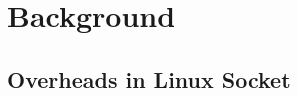 \section{Background}
\label{socksdirect:sec:background}

\subsection{Overheads in Linux Socket}
\label{socksdirect:subsec:motivation}






